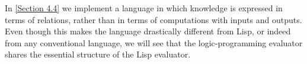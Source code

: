In \cref{Section 4.4} we implement a  language in which knowledge is expressed in terms of relations, rather than in terms of computations with inputs and outputs.
Even though this makes the language drastically different from Lisp, or indeed from any conventional language, we will see that the logic-programming evaluator shares the essential structure of the Lisp evaluator.





